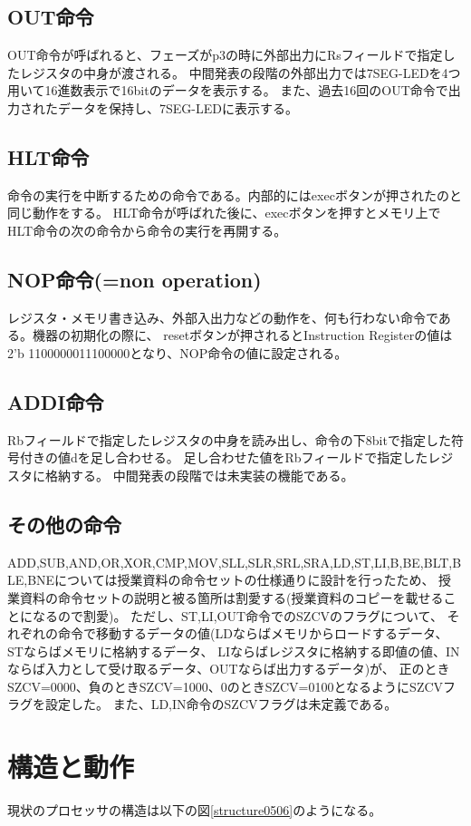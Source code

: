 \documentclass[a4j,titlepage]{jarticle}
\begin{document}
\subsection{OUT命令}
OUT命令が呼ばれると、フェーズがp3の時に外部出力にRsフィールドで指定したレジスタの中身が渡される。
中間発表の段階の外部出力では7SEG-LEDを4つ用いて16進数表示で16bitのデータを表示する。
また、過去16回のOUT命令で出力されたデータを保持し、7SEG-LEDに表示する。

\subsection{HLT命令}
命令の実行を中断するための命令である。内部的にはexecボタンが押されたのと同じ動作をする。
HLT命令が呼ばれた後に、execボタンを押すとメモリ上でHLT命令の次の命令から命令の実行を再開する。

\subsection{NOP命令(=non operation)}
レジスタ・メモリ書き込み、外部入出力などの動作を、何も行わない命令である。機器の初期化の際に、
resetボタンが押されるとInstruction Registerの値は2'b 1100000011100000となり、NOP命令の値に設定される。

\subsection{ADDI命令}
Rbフィールドで指定したレジスタの中身を読み出し、命令の下8bitで指定した符号付きの値dを足し合わせる。
足し合わせた値をRbフィールドで指定したレジスタに格納する。
中間発表の段階では未実装の機能である。

\subsection{その他の命令}
ADD,SUB,AND,OR,XOR,CMP,MOV,SLL,SLR,SRL,SRA,LD,ST,LI,B,BE,BLT,BLE,BNEについては授業資料の命令セットの仕様通りに設計を行ったため、
授業資料の命令セットの説明と被る箇所は割愛する(授業資料のコピーを載せることになるので割愛)。
ただし、ST,LI,OUT命令でのSZCVのフラグについて、
それぞれの命令で移動するデータの値(LDならばメモリからロードするデータ、STならばメモリに格納するデータ、
LIならばレジスタに格納する即値の値、INならば入力として受け取るデータ、OUTならば出力するデータ)が、
正のときSZCV=0000、負のときSZCV=1000、0のときSZCV=0100となるようにSZCVフラグを設定した。
また、LD,IN命令のSZCVフラグは未定義である。

\section{構造と動作}
現状のプロセッサの構造は以下の図\ref{structure0506}のようになる。
\end{document}
